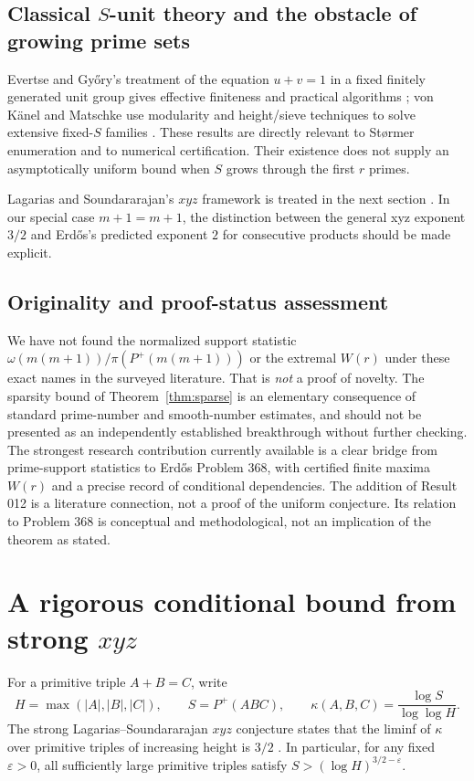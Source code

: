 \documentclass[11pt,letterpaper]{article}
\theoremstyle{remark}
\newcommand{\GPF}{P^{+}}
\begin{document}
\subsection{Classical $S$-unit theory and the obstacle of growing prime sets}
Evertse and Gy\H{o}ry's treatment of the equation $u+v=1$
in a fixed finitely generated unit group gives effective finiteness
and practical algorithms \cite{EvertseGyory}; von K\"anel and
Matschke use modularity and height/sieve techniques to solve
extensive fixed-$S$ families \cite{KaenelMatschke}. These results
are directly relevant to St\o rmer enumeration and to numerical
certification. Their existence does not supply an asymptotically
uniform bound when $S$ grows through the first $r$ primes.

Lagarias and Soundararajan's $xyz$ framework is treated in the
next section \cite{LagariasSound,LagariasSoundCount}. In our
special case $m+1=m+1$, the distinction between the general
xyz exponent $3/2$ and Erd\H{o}s's predicted exponent $2$
for consecutive products should be made explicit.

\subsection{Originality and proof-status assessment}
We have not found the normalized support statistic
$\omega(m(m+1))/\pi(P^+(m(m+1)))$ or the extremal $W(r)$
under these exact names in the surveyed literature. That is
\emph{not} a proof of novelty. The sparsity bound of
Theorem~\ref{thm:sparse} is an elementary consequence of
standard prime-number and smooth-number estimates, and should
not be presented as an independently established breakthrough
without further checking. The strongest research contribution
currently available is a clear bridge from prime-support
statistics to Erd\H{o}s Problem 368, with certified finite
maxima $W(r)$ and a precise record of conditional dependencies.
The addition of Result 012 is a literature connection, not a proof
of the uniform conjecture. Its relation to Problem 368 is conceptual
and methodological, not an implication of the theorem as stated.

\section{A rigorous conditional bound from strong $xyz$}
For a primitive triple $A+B=C$, write
\[
H=\max(|A|,|B|,|C|),\qquad S=\GPF(ABC),\qquad
\kappa(A,B,C)=\frac{\log S}{\log\log H}.
\]
The strong Lagarias--Soundararajan $xyz$ conjecture states that the
liminf of $\kappa$ over primitive triples of increasing height is
$3/2$ \cite{LagariasSound}. In particular, for any fixed
$\varepsilon>0$, all sufficiently large primitive triples satisfy
$S>(\log H)^{3/2-\varepsilon}$.
\end{document}
